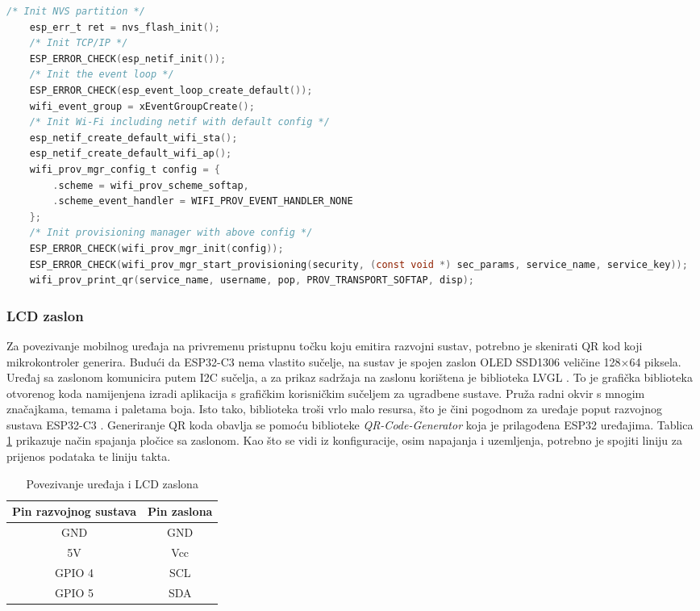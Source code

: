 \begin{lstlisting}[caption={Stvaranje pristupne točke}, language=c]
	/* Init NVS partition */
	esp_err_t ret = nvs_flash_init();
	/* Init TCP/IP */
	ESP_ERROR_CHECK(esp_netif_init());
	/* Init the event loop */
	ESP_ERROR_CHECK(esp_event_loop_create_default());
	wifi_event_group = xEventGroupCreate();
	/* Init Wi-Fi including netif with default config */
	esp_netif_create_default_wifi_sta();
	esp_netif_create_default_wifi_ap();
	wifi_prov_mgr_config_t config = {
		.scheme = wifi_prov_scheme_softap,
		.scheme_event_handler = WIFI_PROV_EVENT_HANDLER_NONE
	};
    /* Init provisioning manager with above config */
	ESP_ERROR_CHECK(wifi_prov_mgr_init(config));
	ESP_ERROR_CHECK(wifi_prov_mgr_start_provisioning(security, (const void *) sec_params, service_name, service_key));
	wifi_prov_print_qr(service_name, username, pop, PROV_TRANSPORT_SOFTAP, disp);
\end{lstlisting}

\subsubsection{LCD zaslon}

Za povezivanje mobilnog uređaja na privremenu pristupnu točku koju emitira razvojni sustav, potrebno je skenirati QR kod koji mikrokontroler generira. Budući da ESP32-C3 nema vlastito sučelje, na sustav je spojen zaslon OLED SSD1306 veličine 128×64 piksela. Uređaj sa zaslonom komunicira putem I2C sučelja, a za prikaz sadržaja na zaslonu korištena je biblioteka LVGL . To je grafička biblioteka otvorenog koda namijenjena izradi aplikacija s grafičkim korisničkim sučeljem  za ugradbene sustave. Pruža radni okvir s mnogim značajkama, temama i paletama boja. Isto tako, biblioteka troši vrlo malo resursa, što je čini pogodnom za uređaje poput razvojnog sustava ESP32-C3 \cite{lvgl}. Generiranje QR koda obavlja se pomoću biblioteke \textit{QR-Code-Generator} koja je prilagođena ESP32 uređajima. Tablica \ref{table:pinout_lcd} prikazuje način spajanja pločice sa zaslonom. Kao što se vidi iz konfiguracije, osim napajanja i uzemljenja, potrebno je spojiti liniju za prijenos podataka te liniju takta. 

\begin{table}[ht!]
	\centering
	\caption{Povezivanje uređaja i LCD zaslona}
	\begin{tabular}{|c| c|}
		\hline
		\rowcolor{lightblue}  
		\textbf{Pin razvojnog sustava} & \textbf{Pin zaslona} \\ \hline
		GND & GND \\ \hline
		5V & Vcc \\ \hline
		GPIO 4 & SCL  \\ \hline
		GPIO 5 & SDA \\ \hline
	\end{tabular}
	\label{table:pinout_lcd}
\end{table}

